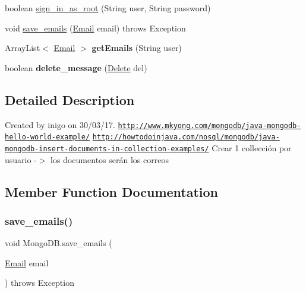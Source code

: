 \begin{DoxyCompactItemize}
\item 
boolean \hyperlink{class_mongo_d_b_afa13d12f56548fcf6c5ca12ec66bc73c}{sign\+\_\+in\+\_\+as\+\_\+root} (String user, String password)
\item 
void \hyperlink{class_mongo_d_b_a2e376b333a71c82b5dd8e054d538e7f4}{save\+\_\+emails} (\hyperlink{class_email}{Email} email)  throws Exception 
\item 
\mbox{\label{class_mongo_d_b_afb31e6d36e9b20ceff3f13901bfc4012}} 
Array\+List$<$ \hyperlink{class_email}{Email} $>$ {\bfseries get\+Emails} (String user)
\item 
\mbox{\label{class_mongo_d_b_a1bc531a4e919dd942edeafc749e30f81}} 
boolean {\bfseries delete\+\_\+message} (\hyperlink{class_delete}{Delete} del)
\end{DoxyCompactItemize}


\subsection{Detailed Description}
Created by inigo on 30/03/17. \href{http://www.mkyong.com/mongodb/java-mongodb-hello-world-example/}{\tt http\+://www.\+mkyong.\+com/mongodb/java-\/mongodb-\/hello-\/world-\/example/} \href{http://howtodoinjava.com/nosql/mongodb/java-mongodb-insert-documents-in-collection-examples/}{\tt http\+://howtodoinjava.\+com/nosql/mongodb/java-\/mongodb-\/insert-\/documents-\/in-\/collection-\/examples/} Crear 1 collección por usuario -\/$>$ los documentos serán los correos 

\subsection{Member Function Documentation}
\mbox{\label{class_mongo_d_b_a2e376b333a71c82b5dd8e054d538e7f4}} 
\subsubsection{\texorpdfstring{save\+\_\+emails()}{save\_emails()}}
{\footnotesize\ttfamily void Mongo\+D\+B.\+save\+\_\+emails (\begin{DoxyParamCaption}\item[{\hyperlink{class_email}{Email}}]{email }\end{DoxyParamCaption}) throws Exception}


